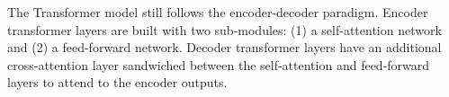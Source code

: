\documentclass[11pt,a4paper]{article}
\begin{document}


The Transformer model still follows the encoder-decoder paradigm. Encoder
transformer layers are built with two sub-modules: (1) a self-attention network
and (2) a feed-forward network. Decoder transformer layers have an additional
cross-attention layer sandwiched between the self-attention and feed-forward
layers to attend to the encoder outputs.
\end{document}
